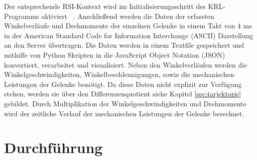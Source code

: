 %
Der entsprechende RSI-Kontext wird im Initialisierungsschritt des KRL-Programms aktiviert ~\cite[S.~50]{RSI.2020}. Anschließend werden die Daten der erfassten Winkelverläufe und Drehmomente der einzelnen Gelenke in einem Takt von 4 ms in der American Standard Code for Information Interchange (ASCII) Darstellung an den Server übertragen. Die Daten werden in einem Textfile gespeichert und mithilfe von Python Skripten in die JavaScript Object Notation (JSON) konvertiert, verarbeitet und visualisiert. 
%
Neben den Winkelverläufen werden die Winkelgeschwindigkeiten, Winkelbeschleunigungen, sowie die mechanischen Leistungen der Gelenke benötigt. Da diese Daten nicht explizit zur Verfügung stehen, werden sie über den Differenzenquotient siehe Kapitel \ref{sec:tarjektorie} gebildet. Durch Multiplikation der Winkelgeschwindigkeiten und Drehmomente wird der zeitliche Verlauf der mechanischen Leistungen der Gelenke berechnet.

\section{Durchführung}

